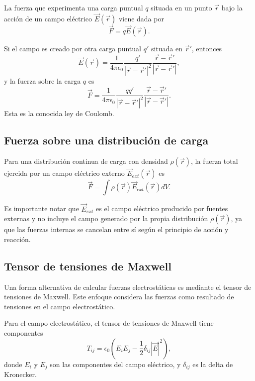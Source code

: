 \documentclass[12pt,a4paper]{book}
\begin{document}
La fuerza que experimenta una carga puntual $q$ situada en un punto $\vec{r}$ bajo la acción de un campo eléctrico $\vec{E}(\vec{r})$ viene dada por
\begin{equation}
\vec{F} = q\vec{E}(\vec{r}).
\end{equation}

Si el campo es creado por otra carga puntual $q'$ situada en $\vec{r}'$, entonces
\begin{equation}
\vec{E}(\vec{r}) = \frac{1}{4\pi\epsilon_0} \frac{q'}{|\vec{r} - \vec{r}'|^2} \frac{\vec{r} - \vec{r}'}{|\vec{r} - \vec{r}'|},
\end{equation}
y la fuerza sobre la carga $q$ es
\begin{equation}
\vec{F} = \frac{1}{4\pi\epsilon_0} \frac{qq'}{|\vec{r} - \vec{r}'|^2} \frac{\vec{r} - \vec{r}'}{|\vec{r} - \vec{r}'|}.
\end{equation}
Esta es la conocida ley de Coulomb.

\subsection{Fuerza sobre una distribución de carga}

Para una distribución continua de carga con densidad $\rho(\vec{r})$, la fuerza total ejercida por un campo eléctrico externo $\vec{E}_{ext}(\vec{r})$ es
\begin{equation}
\vec{F} = \int \rho(\vec{r}) \vec{E}_{ext}(\vec{r}) dV.
\end{equation}

Es importante notar que $\vec{E}_{ext}$ es el campo eléctrico producido por fuentes externas y no incluye el campo generado por la propia distribución $\rho(\vec{r})$, ya que las fuerzas internas se cancelan entre sí según el principio de acción y reacción.

\subsection{Tensor de tensiones de Maxwell}

Una forma alternativa de calcular fuerzas electrostáticas es mediante el tensor de tensiones de Maxwell. Este enfoque considera las fuerzas como resultado de tensiones en el campo electrostático.

Para el campo electrostático, el tensor de tensiones de Maxwell tiene componentes
\begin{equation}
T_{ij} = \epsilon_0 \left( E_i E_j - \frac{1}{2} \delta_{ij} |\vec{E}|^2 \right),
\end{equation}
donde $E_i$ y $E_j$ son las componentes del campo eléctrico, y $\delta_{ij}$ es la delta de Kronecker.
\end{document}
